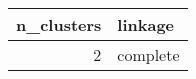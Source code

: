 \begin{tabular}{rl}
\toprule
n_clusters & linkage \\
\midrule
2 & complete \\
\bottomrule
\end{tabular}

